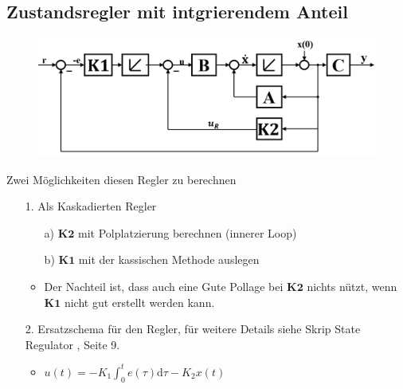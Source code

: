 \subsection{Zustandsregler mit intgrierendem Anteil}
\begin{figure}[h!]
	\includegraphics[width=0.5\linewidth]{bilder/zrdIntegrierend}
	\label{fig:zrdintegrierend}
\end{figure}
Zwei Möglichkeiten diesen Regler zu berechnen
\begin{itemize}
	\item[1.] Als Kaskadierten Regler
	\begin{itemize}
		\item [a)] $\boldsymbol{K2}$ mit Polplatzierung berechnen (innerer Loop)
		\item [b)] $\boldsymbol{K1}$ mit der kassischen Methode auslegen
		\item  Der Nachteil ist, dass auch eine Gute Pollage bei $\boldsymbol{K2}$ nichts nützt, wenn $\boldsymbol{K1}$ nicht gut erstellt werden kann. 
	\end{itemize}
	\item[2.] Ersatzschema für den Regler, für weitere Details siehe Skrip \glqq State Regulator \grqq, Seite 9.
	\begin{itemize}
		\item $u(t) = -K_1 \int_{0}^{t}e(\tau)\text{d}\tau-K_2x(t)$
	\end{itemize}
\end{itemize}
\newpage

